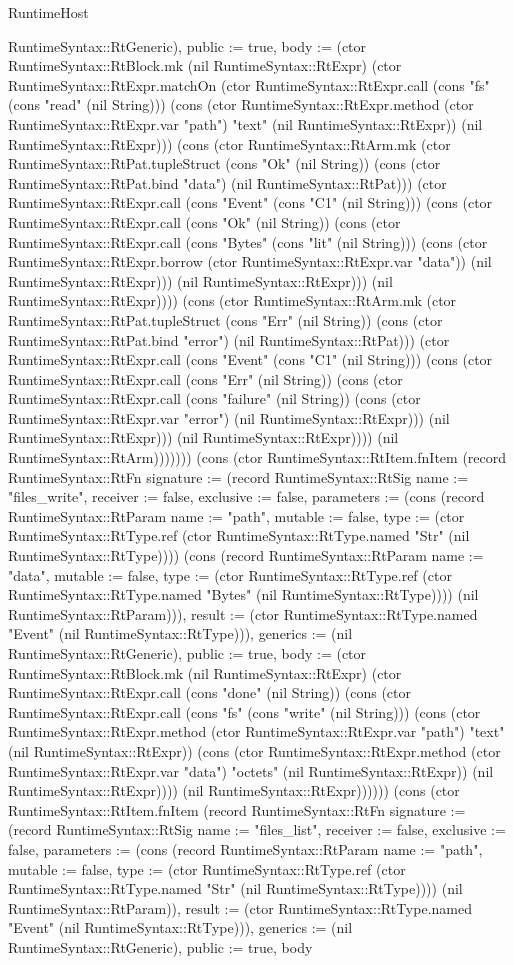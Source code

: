 \begin{lexlean}{RuntimeHost}
\begin{semanticmodule}
{RuntimeSyntax::RtGeneric), public := true, body := (ctor RuntimeSyntax::RtBlock.mk (nil RuntimeSyntax::RtExpr) (ctor RuntimeSyntax::RtExpr.matchOn (ctor RuntimeSyntax::RtExpr.call (cons "fs" (cons "read" (nil String))) (cons (ctor RuntimeSyntax::RtExpr.method (ctor RuntimeSyntax::RtExpr.var "path") "text" (nil RuntimeSyntax::RtExpr)) (nil RuntimeSyntax::RtExpr))) (cons (ctor RuntimeSyntax::RtArm.mk (ctor RuntimeSyntax::RtPat.tupleStruct (cons "Ok" (nil String)) (cons (ctor RuntimeSyntax::RtPat.bind "data") (nil RuntimeSyntax::RtPat))) (ctor RuntimeSyntax::RtExpr.call (cons "Event" (cons "C1" (nil String))) (cons (ctor RuntimeSyntax::RtExpr.call (cons "Ok" (nil String)) (cons (ctor RuntimeSyntax::RtExpr.call (cons "Bytes" (cons "lit" (nil String))) (cons (ctor RuntimeSyntax::RtExpr.borrow (ctor RuntimeSyntax::RtExpr.var "data")) (nil RuntimeSyntax::RtExpr))) (nil RuntimeSyntax::RtExpr))) (nil RuntimeSyntax::RtExpr)))) (cons (ctor RuntimeSyntax::RtArm.mk (ctor RuntimeSyntax::RtPat.tupleStruct (cons "Err" (nil String)) (cons (ctor RuntimeSyntax::RtPat.bind "error") (nil RuntimeSyntax::RtPat))) (ctor RuntimeSyntax::RtExpr.call (cons "Event" (cons "C1" (nil String))) (cons (ctor RuntimeSyntax::RtExpr.call (cons "Err" (nil String)) (cons (ctor RuntimeSyntax::RtExpr.call (cons "failure" (nil String)) (cons (ctor RuntimeSyntax::RtExpr.var "error") (nil RuntimeSyntax::RtExpr))) (nil RuntimeSyntax::RtExpr))) (nil RuntimeSyntax::RtExpr)))) (nil RuntimeSyntax::RtArm)))))})) (cons (ctor RuntimeSyntax::RtItem.fnItem (record RuntimeSyntax::RtFn {signature := (record RuntimeSyntax::RtSig {name := "files_write", receiver := false, exclusive := false, parameters := (cons (record RuntimeSyntax::RtParam {name := "path", mutable := false, type := (ctor RuntimeSyntax::RtType.ref (ctor RuntimeSyntax::RtType.named "Str" (nil RuntimeSyntax::RtType)))}) (cons (record RuntimeSyntax::RtParam {name := "data", mutable := false, type := (ctor RuntimeSyntax::RtType.ref (ctor RuntimeSyntax::RtType.named "Bytes" (nil RuntimeSyntax::RtType)))}) (nil RuntimeSyntax::RtParam))), result := (ctor RuntimeSyntax::RtType.named "Event" (nil RuntimeSyntax::RtType))}), generics := (nil RuntimeSyntax::RtGeneric), public := true, body := (ctor RuntimeSyntax::RtBlock.mk (nil RuntimeSyntax::RtExpr) (ctor RuntimeSyntax::RtExpr.call (cons "done" (nil String)) (cons (ctor RuntimeSyntax::RtExpr.call (cons "fs" (cons "write" (nil String))) (cons (ctor RuntimeSyntax::RtExpr.method (ctor RuntimeSyntax::RtExpr.var "path") "text" (nil RuntimeSyntax::RtExpr)) (cons (ctor RuntimeSyntax::RtExpr.method (ctor RuntimeSyntax::RtExpr.var "data") "octets" (nil RuntimeSyntax::RtExpr)) (nil RuntimeSyntax::RtExpr)))) (nil RuntimeSyntax::RtExpr))))})) (cons (ctor RuntimeSyntax::RtItem.fnItem (record RuntimeSyntax::RtFn {signature := (record RuntimeSyntax::RtSig {name := "files_list", receiver := false, exclusive := false, parameters := (cons (record RuntimeSyntax::RtParam {name := "path", mutable := false, type := (ctor RuntimeSyntax::RtType.ref (ctor RuntimeSyntax::RtType.named "Str" (nil RuntimeSyntax::RtType)))}) (nil RuntimeSyntax::RtParam)), result := (ctor RuntimeSyntax::RtType.named "Event" (nil RuntimeSyntax::RtType))}), generics := (nil RuntimeSyntax::RtGeneric), public := true, body }
\end{semanticmodule}
\end{lexlean}
